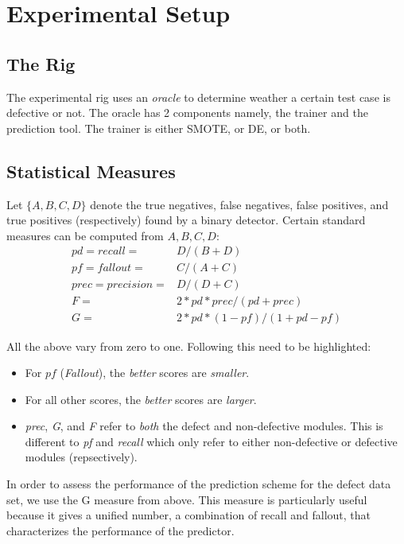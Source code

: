 \documentclass[12pt]{IEEEtran}
\begin{document}
\section{Experimental Setup} \label{setup}
\subsection{The Rig}

The experimental rig uses an \textit{oracle} to determine weather a certain test case is defective or not. The oracle has 2 components namely, the trainer and the prediction tool. The trainer is either SMOTE, or DE, or both.

\subsection{Statistical Measures} \label{stats}
Let $\{A,B,C,D\}$ denote the
true negatives, 
false negatives, 
false positives, and 
true positives
(respectively) found by a binary detector. 
Certain standard measures can be computed from
$A,B,C,D$: 
{\footnotesize
{\[
	\begin{array}{ll}
	pd=recall=&D/(B+D)\\
	pf=fallout=&C/(A+C)\\ 
	prec=precision=&D/(D+C) \\
	F =&2*pd*prec/(pd + prec)\\
	G =&2*pd*(1-pf)/(1+ pd - pf)
	\end{array}
	\]}}

All the above vary from zero to one. Following this need to be highlighted:
\begin{itemize}
\item For $pf$ (\textit{Fallout}), the {\em better} scores are {\em smaller}.
\item For all other scores, the {\em better} scores are {\em larger}.
\item  {\em prec}, \textit{G}, and {\em F} refer to {\em both} the defect and non-defective modules. This is different to {\em pf} and {\em recall} which only refer to either non-defective or defective modules (repsectively). 
\end{itemize}


In order to assess the performance of the prediction scheme for the defect data set, we use the G measure from above. This measure is particularly useful because it gives a unified number, a combination of recall and fallout, that characterizes the performance of the predictor. 
\end{document}
